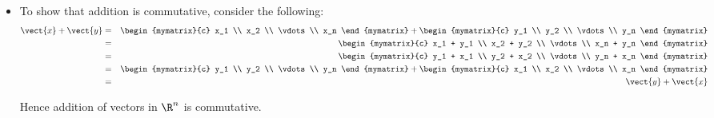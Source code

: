\begin{solution}
\begin{itemize}
\item
To show that addition is commutative, consider the following:
\begin{eqnarray*}
\vect{x} + \vect{y} &=& \begin{mymatrix}{c}
x_1 \\
x_2 \\
\vdots \\
x_n
\end{mymatrix} + \begin{mymatrix}{c}
y_1 \\
y_2 \\
\vdots \\
y_n
\end{mymatrix} \\
&=& \begin{mymatrix}{c}
x_1 + y_1 \\
x_2 + y_2 \\
\vdots \\
x_n + y_n 
\end{mymatrix} \\ 
&=& \begin{mymatrix}{c}
y_1 + x_1 \\
y_2 + x_2 \\
\vdots \\
y_n + x_n 
\end{mymatrix} \\ 
&=& \begin{mymatrix}{c}
y_1 \\
y_2 \\
\vdots \\
y_n
\end{mymatrix} + \begin{mymatrix}{c}
x_1 \\
x_2 \\
\vdots \\
x_n
\end{mymatrix} \\
&=& \vect{y} + \vect{x}
\end{eqnarray*}

Hence addition of vectors in $\R^n$ is commutative. 


\end{itemize}
\end{solution}

